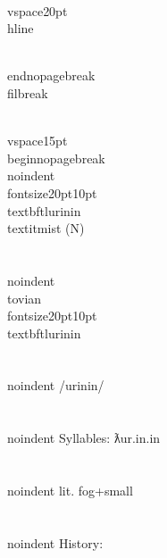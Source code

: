 \\vspace{20pt}\\hline

\\end{nopagebreak}
\\filbreak



\\vspace{15pt}
\\begin{nopagebreak}
\\noindent{\\fontsize{20pt}{10pt}\\textbf{tlurinin} } \\textit{mist} (N)\\\\
\\noindent {\\tovian \\fontsize{20pt}{10pt} \\textbf{tlurinin} }\\\\
\\noindent /{}ur{\textprimstress}inin/\\\\
\\noindent Syllables: ƛur.in.in\\\\
\\noindent lit. fog+small\\\\


\\noindent History:

